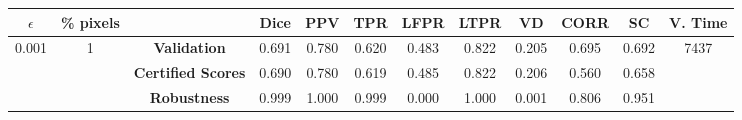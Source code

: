 \begin{longtable}{ c  c | c | c  c  c  c  c  c  c c c}
\toprule \textbf{$\epsilon$} & \textbf{\% pixels} & & \textbf{Dice} & \textbf{PPV} & \textbf{TPR} & \textbf{LFPR} & \textbf{LTPR} & \textbf{VD} & \textbf{CORR} & \textbf{SC} & \textbf{V. Time} \\
\midrule 
\multirow{3}{*}{0.001}  & \multirow{3}{*}{1} &\textbf{Validation} & 0.691 & 0.780 & 0.620 & 0.483 & 0.822 & 0.205 & 0.695 & 0.692 & \multirow{3}{*}{7437} \\
 & & \textbf{Certified Scores} & 0.690 & 0.780 & 0.619 & 0.485 & 0.822 & 0.206 & 0.560 & 0.658 & \\
& & \textbf{Robustness} & 0.999 & 1.000 & 0.999 & 0.000 & 1.000 & 0.001 & 0.806 & 0.951 & \\
\end{longtable}